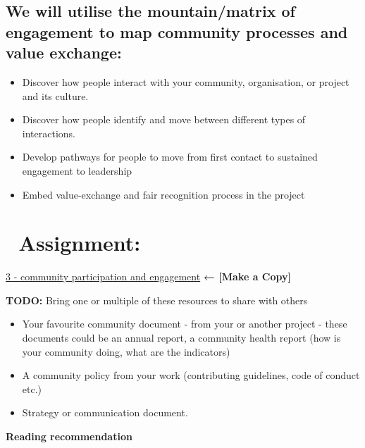 \documentclass[
  letterpaper,
  DIV=11,
  numbers=noendperiod]{scrreport}
\providecommand{\tightlist}{%
  \setlength{\itemsep}{0pt}\setlength{\parskip}{0pt}}\usepackage{longtable,booktabs,array}
\begin{document}
\hypertarget{we-will-utilise-the-mountainmatrix-of-engagement-to-map-community-processes-and-value-exchange}{%
\subsection{We will utilise the mountain/matrix of engagement to map
community processes and value
exchange:}\label{we-will-utilise-the-mountainmatrix-of-engagement-to-map-community-processes-and-value-exchange}}

\begin{itemize}
\tightlist
\item
  Discover how people interact with your community, organisation, or
  project and its culture.
\item
  Discover how people identify and move between different types of
  interactions.
\item
  Develop pathways for people to move from first contact to sustained
  engagement to leadership
\item
  Embed value-exchange and fair recognition process in the project
\end{itemize}

\hypertarget{assignment-1}{%
\section{\texorpdfstring{📝
\textbf{Assignment:}}{📝 Assignment:}}\label{assignment-1}}

\href{https://docs.google.com/document/d/1JtsNwZUHtSfKQKeyR36e97tgN8BR-MQEMx2MHNtBsYI/edit\#}{3
- community participation and engagement} \textbf{← {[}Make a Copy{]}}

\textbf{TODO:} Bring one or multiple of these resources to share with
others

\begin{itemize}
\tightlist
\item
  Your favourite community document - from your or another project -
  these documents could be an annual report, a community health report
  (how is your community doing, what are the indicators)
\item
  A community policy from your work (contributing guidelines, code of
  conduct etc.)
\item
  Strategy or communication document.
\end{itemize}

\textbf{Reading recommendation}
\end{document}
